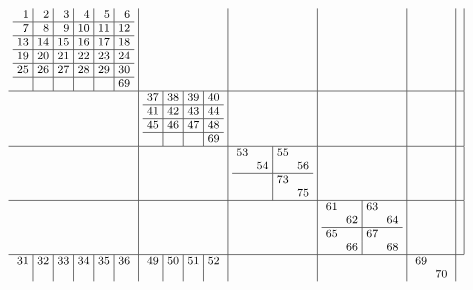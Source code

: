 \documentclass[12pt,a4paper]{amsart}
\begin{document}
\begin{align*}\footnotesize\arraycolsep3pt
  \begin{array}{c|c|c|c|c|c|c}
\begin{array}{r|r|r|r|r|r}%
1&2&3&4&5&6\\\hline%
7&8&9&10&11&12\\\hline%
13&14&15&16&17&18\\\hline%
19&20&21&22&23&24\\\hline%
25&26&27&28&29&30\\\hline%
  &  &  &  &  &69\\%
\end{array}%
&&&&& \\\hline
&
\begin{array}{r|r|r|r}%
37&38&39&40\\\hline%
41&42&43&44\\\hline%
45&46&47&48\\\hline%
  &  &  &69\\%
\end{array}%
&&&& \\\hline
&&
\begin{array}{rr|rr}%
53&  &55&  \\%
  &54&  &56\\\hline%
  &  &73&  \\%
  &  &  &75\\%
\end{array}%
&&& \\\hline
&&&
\begin{array}{rr|rr}%
61&  &63&  \\%
  &62&  &64\\\hline%
65&  &67&  \\%
  &66&  &68\\%
\end{array}%
&& \\\hline
\begin{array}{r|r|r|r|r|r}%
31&32&33&34&35&36\\%
  &  &  &  &  &  \\%
\end{array}%
&
\begin{array}{r|r|r|r}%
49&50&51&52\\%
  &  &  &  \\%
\end{array}%
&&&
\begin{array}{rr}%
69&  \\%
  &70\\%
\end{array}%

\end{array}
\end{align*}
\end{document}
